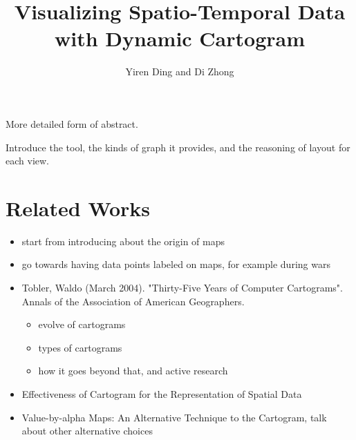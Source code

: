 \documentclass[journal]{vgtc}                %
\title{Visualizing Spatio-Temporal Data with Dynamic Cartogram}
\author{Yiren Ding and Di Zhong}
\begin{document}


\maketitle

More detailed form of abstract. 

Introduce the tool, the kinds of graph it provides, and the reasoning of layout for each view.

\section{Related Works}

\begin{itemize}

\item start from introducing about the origin of maps

\item go towards having data points labeled on maps, for example during wars

\item Tobler, Waldo (March 2004). "Thirty-Five Years of Computer Cartograms". Annals of the Association of American Geographers.
\begin{itemize}
\item evolve of cartograms
\item types of cartograms
\item how it goes beyond that, and active research
\end{itemize}
\item Effectiveness of Cartogram for the Representation of Spatial Data

\item Value-by-alpha Maps: An Alternative Technique to the Cartogram, talk about other alternative choices

\end{itemize}
\end{document}

